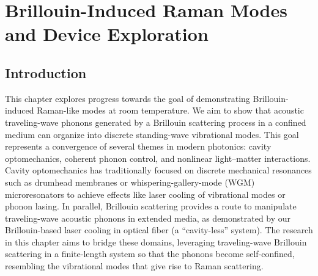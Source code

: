 \setcounter{rownumber}{0}
\singlespacing
\chapter{Brillouin-Induced Raman Modes and Device Exploration}
\label{ch:Raman}
\acresetall

\doublespacing


\section{Introduction}
\label{sec:Raman:Introduction}

This chapter explores progress towards the goal of demonstrating Brillouin-induced Raman-like modes at room temperature. We aim to show that acoustic traveling-wave phonons generated by a Brillouin scattering process in a confined medium can organize into discrete standing-wave vibrational modes. This goal represents a convergence of several themes in modern photonics: cavity optomechanics, coherent phonon control, and nonlinear light–matter interactions. Cavity optomechanics has traditionally focused on discrete mechanical resonances such as drumhead membranes or whispering-gallery-mode (\acs{WGM}) microresonators to achieve effects like laser cooling of vibrational modes or phonon lasing. \cite{kippenberg2008cavity, chan2011laser, aspelmeyer2014cavity, vahala2009phonon} In parallel, Brillouin scattering provides a route to manipulate traveling-wave acoustic phonons in extended media, as demonstrated by our Brillouin-based laser cooling in optical fiber (a ``cavity-less'' system). \cite{johnson2023laser, eggleton2013inducing, bahl2012observation, otterstrom2018optomechanical} The research in this chapter aims to bridge these domains, leveraging traveling-wave Brillouin scattering in a finite-length system so that the phonons become self-confined, resembling the vibrational modes that give rise to Raman scattering.

